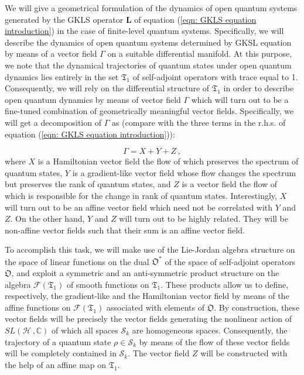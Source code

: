 \documentclass[11pt]{article}
\newcommand{\be}{\begin{equation}}
\newcommand{\ee}{\end{equation}}
\newcommand{\vsp}{\vspace{0.4cm}}
\newcommand{\stsp}{\mathcal{S}}
\newcommand{\obsp}{\mathfrak{O}}
\begin{document}
\vsp


We will give a geometrical formulation of the dynamics of open quantum systems generated by the GKLS operator $\mathbf{L}$ of equation (\ref{eqn: GKLS equation introduction}) in the case of finite-level quantum systems.
Specifically, we will describe the dynamics of open quantum systems determined by GKSL equation by means of a vector field $\Gamma$ on a suitable differential manifold.
At this purpose, we note that the dynamical trajectories of quantum states under open quantum dynamics lies entirely in the set $\mathfrak{T}_{1}$ of self-adjoint operators with trace equal to 1.
Consequently, we will rely on the differential structure of $\mathfrak{T}_{1}$ in order to describe open quantum dynamics by means of vector field $\Gamma$ which will turn out to be a fine-tuned combination of geometrically meaningful vector fields.
Specifically, we will get a decomposition of $\Gamma$ as (compare with the three terms in the r.h.s. of equation (\ref{eqn: GKLS equation introduction})):

\be
\Gamma= X + Y + Z\,,
\ee
where $X$ is a Hamiltonian vector field the flow of which preserves the spectrum of quantum states, $Y$ is a gradient-like vector field whose flow changes the spectrum but preserves the rank of quantum states, and $Z$ is a vector field the flow of which is responsible for the change in rank of quantum states.
Interestingly, $X$ will turn out to be an affine vector field which need not be correlated with $Y$ and $Z$.
On the other hand, $Y$ and $Z$ will turn out to be highly related.
They will be non-affine vector fields such that their sum is an affine vector field.

To accomplish this task, we will make use of the Lie-Jordan algebra structure on the space of linear functions on the dual $\obsp^{*}$ of the space of self-adjoint operators $\obsp$, and exploit  a symmetric and an anti-symmetric product structure on the algebra $\mathcal{F}(\mathfrak{T}_{1})$ of smooth functions on $\mathfrak{T}_{1}$.
These products allow us to define, respectively,  the gradient-like and the Hamiltonian vector field by means of the affine functions on $\mathcal{F}(\mathfrak{T}_{1})$ associated with elements of $\obsp$.
By construction, these vector fields will be precisely the vector fields generating the nonlinear action of $SL(\mathcal{H}\,,\mathbb{C})$ of which all spaces $\stsp_{k}$ are homogeneous spaces.
Consequently, the trajectory of a quantum state $\rho\in\stsp_{k}$ by means of the flow of these vector fields will be completely contained in $\stsp_{k}$.
The vector field $Z$ will be constructed with the help of an affine map on $\mathfrak{T}_{1}$.
\end{document}
